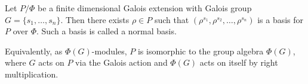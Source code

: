 Let $P/\Phi$ be a finite dimensional Galois extension with Galois group $G = \{s_1, \dots, s_n\}$. Then there exists $\rho \in P$ such that $(\rho^{s_1}, \rho^{s_2}, \dots, \rho^{s_n})$ is a basis for $P$ over $\Phi$. Such a basis is called a normal basis.

Equivalently, as $\Phi(G)$-modules, $P$ is isomorphic to the group algebra $\Phi(G)$, where $G$ acts on $P$ via the Galois action and $\Phi(G)$ acts on itself by right multiplication.
